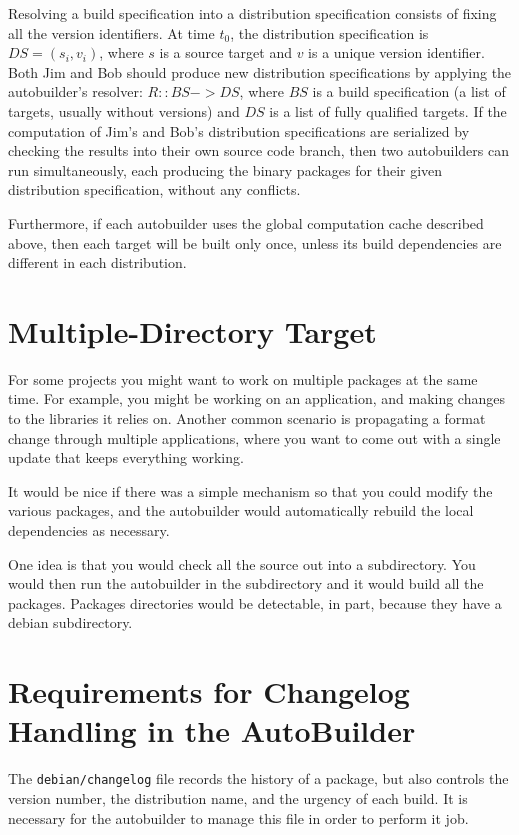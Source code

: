 \documentclass[12pt]{article}
\begin{document}
Resolving a build specification into a distribution specification
consists of fixing all the version identifiers.  At time $t_0$, the
distribution specification is $DS={(s_i,v_i)}$, where $s$ is a source
target and $v$ is a unique version identifier.  Both Jim and Bob
should produce new distribution specifications by applying the
autobuilder's resolver:  $ R :: BS -> DS$, where $BS$ is a build
specification (a list of targets, usually without versions) and $DS$
is a list of fully qualified targets.  If the computation of Jim's and Bob's
distribution specifications are serialized by checking the results
into their own source code branch, then two autobuilders can run
simultaneously, each producing the binary packages for their given
distribution specification, without any conflicts.

Furthermore, if each autobuilder uses the global computation cache
described above, then each target will be built only once, unless its
build dependencies are different in each distribution.



\section{Multiple-Directory Target}

For some projects you might want to work on multiple packages at the
same time. For example, you might be working on an application, and
making changes to the libraries it relies on.  Another common scenario
is propagating a format change through multiple applications, where
you want to come out with a single update that keeps everything working.

It would be nice if there was a simple mechanism so that you could
modify the various packages, and the autobuilder would automatically
rebuild the local dependencies as necessary.

One idea is that you would check all the source out into a
subdirectory. You would then run the autobuilder in the subdirectory
and it would build all the packages. Packages directories would be
detectable, in part, because they have a debian subdirectory.



\section{Requirements for Changelog Handling in the AutoBuilder}

The {\tt debian/changelog} file records the history of a package, but
also controls the version number, the distribution name, and the
urgency of each build.  It is necessary for the autobuilder to manage
this file in order to perform it job.
\end{document}
